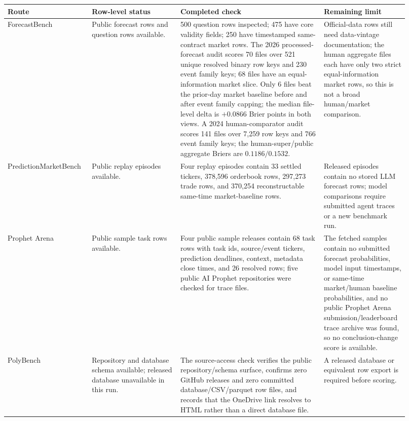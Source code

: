 \documentclass[11pt]{article}
\begin{document}
\begin{table}[htbp]
\centering
\scriptsize
\begin{tabular}{@{}L{0.18\linewidth} L{0.21\linewidth} L{0.34\linewidth} L{0.19\linewidth}@{}}
\toprule
Route & Row-level status & Completed check & Remaining limit \\
\midrule
ForecastBench & Public forecast rows and question rows available. & 500 question rows inspected; 475 have core validity fields; 250 have timestamped same-contract market rows. The 2026 processed-forecast audit scores 70 files over 521 unique resolved binary row keys and 230 event family keys; 68 files have an equal-information market slice. Only 6 files beat the prior-day market baseline before and after event family capping; the median file-level delta is \(+0.0866\) Brier points in both views. A 2024 human-comparator audit scores 141 files over 7{,}259 row keys and 766 event family keys; the human-super/public aggregate Briers are \(0.1186/0.1532\). & Official-data rows still need data-vintage documentation; the human aggregate files each have only two strict equal-information market rows, so this is not a broad human/market comparison. \\
Prediction\hspace{0pt}Market\hspace{0pt}Bench & Public replay episodes available. & Four replay episodes contain 33 settled tickers, 378{,}596 orderbook rows, 297{,}273 trade rows, and 370{,}254 reconstructable same-time market-baseline rows. & Released episodes contain no stored LLM forecast rows; model comparisons require submitted agent traces or a new benchmark run. \\
Prophet Arena & Public sample task rows available. & Four public sample releases contain 68 task rows with task ids, source/event tickers, prediction deadlines, context, metadata close times, and 26 resolved rows; five public AI Prophet repositories were checked for trace files. & The fetched samples contain no submitted forecast probabilities, model input timestamps, or same-time market/human baseline probabilities, and no public Prophet Arena submission/leaderboard trace archive was found, so no conclusion-change score is available. \\
PolyBench & Repository and database schema available; released database unavailable in this run. & The source-access check verifies the public repository/schema surface, confirms zero GitHub releases and zero committed database/CSV/parquet row files, and records that the OneDrive link resolves to HTML rather than a direct database file. & A released database or equivalent row export is required before scoring. \\

\end{tabular}
\end{table}
\end{document}
